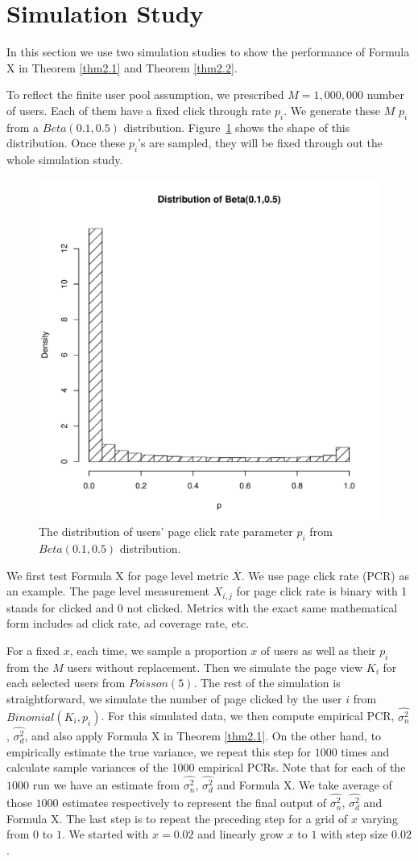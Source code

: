 \documentclass[10pt]{article}
\newcommand{\wht}{\widehat}
\newcommand{\xbar}{\overline{X}}
\newcommand{\naiveest}{\wht{\sigma^2_n}}
\newcommand{\deltaest}{\wht{\sigma^2_d}}
\begin{document}
\section{Simulation Study}\label{simulation}
In this section we use two simulation studies to show the performance of Formula X in Theorem \ref{thm2.1} and Theorem \ref{thm2.2}. 

To reflect the finite user pool assumption, we prescribed $M=1,000,000$ number of users. Each of them have a fixed click through rate $p_i$. We generate these $M$ $p_i$ from a $Beta(0.1,0.5)$ distribution. Figure~\ref{fig:beta-dist} shows the shape of this distribution. Once these $p_i$'s are sampled, they will be fixed through out the whole simulation study. 
\begin{figure}[!hbtp]
  \centering
  \includegraphics[width=.5\textwidth]{beta-dist}
  \caption{The distribution of users' page click rate parameter $p_i$ from $Beta(0.1,0.5)$ distribution.}
  \label{fig:beta-dist}
\end{figure}

We first test Formula X for page level metric $\xbar$. We  use page click rate (PCR) as an example. The page level measurement $X_{i,j}$ for page click rate is binary with 1 stands for clicked and 0 not clicked. Metrics with the exact same mathematical form includes ad click rate, ad coverage rate, etc. 

For a fixed $x$, each time, we sample a proportion $x$ of users as well as their $p_i$ from the $M$ users without replacement. Then we simulate the page view $K_i$ for each selected users from $Poisson(5)$. The rest of the simulation is straightforward, we simulate the number of page clicked by the user $i$ from $Binomial(K_i,p_i)$. For this simulated data, we then compute empirical PCR, $\naiveest$, $\deltaest$, and also apply Formula X in Theorem \ref{thm2.1}. On the other hand, to empirically estimate the true variance, we repeat this step for $1000$ times and calculate sample variances of the 1000 empirical PCRs. Note that for each of the $1000$ run we have an estimate from  $\naiveest$, $\deltaest$ and  Formula X. We take average of those $1000$ estimates respectively to represent the final output of $\naiveest$, $\deltaest$ and Formula X. The last step is to repeat the preceding step for a grid of $x$ varying from $0$ to $1$. We started with $x=0.02$ and linearly grow $x$ to $1$ with step size $0.02$. 
\end{document}
